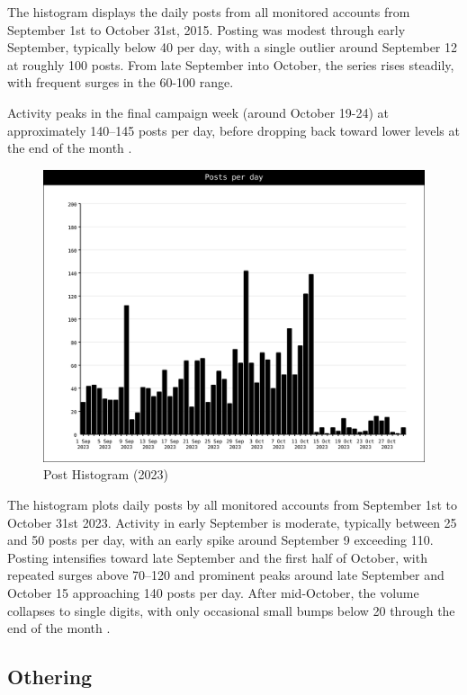 \pagebreak

The histogram displays the daily posts from all monitored accounts from September 1st to October 31st, 2015. Posting was modest through early September, typically below 40 per day, with a single outlier around September 12 at roughly 100 posts. From late September into October, the series rises steadily, with frequent surges in the 60-100 range. 

Activity peaks in the final campaign week (around October 19-24) at approximately 140–145 posts per day, before dropping back toward lower levels at the end of the month \citep{rybicki_2025_16933320}.

\begin{figure}[h!]
\centering
\includegraphics[width=\linewidth]{Graphics/histogram-2023.png}
\caption{Post Histogram (2023)}
\end{figure}

The histogram plots daily posts by all monitored accounts from September 1st to October 31st 2023. Activity in early September is moderate, typically between 25 and 50 posts per day, with an early spike around September 9 exceeding 110. Posting intensifies toward late September and the first half of October, with repeated surges above 70–120 and prominent peaks around late September and October 15 approaching 140 posts per day. After mid-October, the volume collapses to single digits, with only occasional small bumps below 20 through the end of the month \citep{rybicki_2025_16933320}.

\subsection{Othering}

